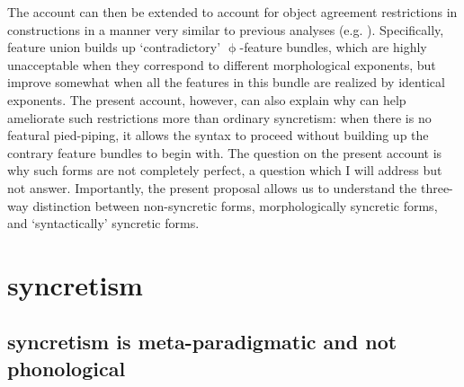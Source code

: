\documentclass[output=paper]{langscibook}
\begin{document}
 The account can then be extended to account for object agreement restrictions in \datnom constructions in a manner very similar to previous analyses (e.g. \citealt{DAlessandro:2003oy,Holmberg:2004gk,Schutze:2003mh,SigurTHsson:2008dm,Ussery:2009jd}). Specifically, feature union builds up `contradictory' $\upphi$-feature bundles, which are highly unacceptable when they correspond to different morphological exponents, but improve somewhat when all the features in this bundle are realized by identical exponents. The present account, however, can also explain why \sti can help ameliorate such restrictions more than ordinary syncretism: when there is no featural pied-piping, it allows the syntax to proceed without building up the contrary feature bundles to begin with. The question on the present account is why such forms are not completely perfect, a question which I will address but not answer. Importantly, the present proposal allows us to understand the three-way distinction between non-syncretic forms, morphologically syncretic forms, and `syntactically' syncretic forms. 





\section{\sti syncretism} 

\subsection{\sti syncretism is meta-paradigmatic and not phonological}

\end{document}
